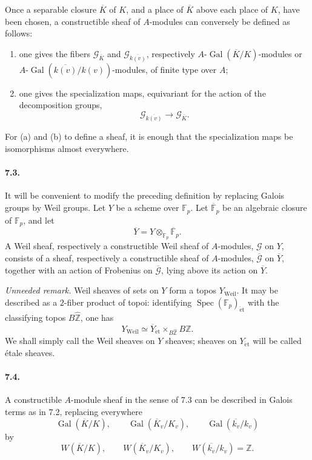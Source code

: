 \documentclass[10pt]{article}
\newcommand{\F}{\mathbb F}
\newcommand{\Gal}{\operatorname{Gal}}
\newcommand{\Spec}{\operatorname{Spec}}
\providecommand{\Spec}{\operatorname{Spec}}
\providecommand{\Gal}{\operatorname{Gal}}
\providecommand{\Gal}{\operatorname{Gal}}
\providecommand{\Spec}{\operatorname{Spec}}
\providecommand{\Spec}{\operatorname{Spec}}
\providecommand{\Gal}{\operatorname{Gal}}
\providecommand{\Gal}{\operatorname{Gal}}
\begin{document}
Once a separable closure \(\overline K\) of \(K\), and a place of \(\overline K\) above each place of \(K\), have been chosen, a constructible sheaf of \(A\)-modules can conversely be defined as follows:
\begin{enumerate}[label=(\alph*)]
\item one gives the fibers \(\mathcal G_{\overline K}\) and \(\mathcal G_{\overline{k(v)}}\), respectively \(A\)-\(\Gal(\overline K/K)\)-modules or \(A\)-\(\Gal(\overline{k(v)}/k(v))\)-modules, of finite type over \(A\);
\item one gives the specialization maps, equivariant for the action of the decomposition groups,
\[
\mathcal G_{\overline{k(v)}}\longrightarrow\mathcal G_{\overline K}.
\]
\end{enumerate}
For (a) and (b) to define a sheaf, it is enough that the specialization maps be isomorphisms almost everywhere.

\paragraph{7.3.} It will be convenient to modify the preceding definition by replacing Galois groups by Weil groups. Let \(Y\) be a scheme over \(\F_p\). Let \(\overline{\F}_p\) be an algebraic closure of \(\F_p\), and let
\[
\overline Y=Y\otimes_{\F_p}\overline{\F}_p.
\]
A Weil sheaf, respectively a constructible Weil sheaf of \(A\)-modules, \(\mathcal G\) on \(Y\), consists of a sheaf, respectively a constructible sheaf of \(A\)-modules, \(\overline{\mathcal G}\) on \(\overline Y\), together with an action of Frobenius on \(\overline{\mathcal G}\), lying above its action on \(\overline Y\).

\emph{Unneeded remark.} Weil sheaves of sets on \(Y\) form a topos \(Y_{\mathrm{Weil}}\). It may be described as a \(2\)-fiber product of topoi: identifying \(\Spec(\F_p)_{\mathrm{\acute et}}\) with the classifying topos \(B\widehat{\mathbb Z}\), one has
\[
Y_{\mathrm{Weil}}\simeq
\overline Y_{\mathrm{\acute et}}\times_{B\widehat{\mathbb Z}}B\mathbb Z.
\]
We shall simply call the Weil sheaves on \(Y\) sheaves; sheaves on \(Y_{\mathrm{\acute et}}\) will be called étale sheaves.

\paragraph{7.4.} A constructible \(A\)-module sheaf in the sense of 7.3 can be described in Galois terms as in 7.2, replacing everywhere
\[
\Gal(\overline K/K),\qquad
\Gal(\overline K_v/K_v),\qquad
\Gal(\overline{k_v}/k_v)
\]
by
\[
W(\overline K/K),\qquad
W(\overline K_v/K_v),\qquad
W(\overline{k_v}/k_v)=\mathbb Z.
\]
\end{document}
